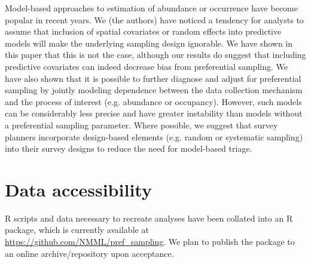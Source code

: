 \documentclass[times,mee,doublespace,]{besauth2}
\begin{document}
Model-based approaches to estimation of abundance or occurrence have become popular in recent years.  We (the authors) have noticed a tendency for analysts to assume that inclusion of spatial covariates or random effects into predictive models will make the underlying sampling design ignorable. We have shown in this paper that this is not the case, although our results do suggest that including predictive covariates can indeed decrease bias from preferential sampling.  We have also shown that it is possible to further diagnose and adjust for preferential sampling by jointly modeling dependence between the data collection mechanism and the process of interest (e.g. abundance or occupancy).  However, such models can be considerably less precise and have greater instability than models without a preferential sampling parameter. Where possible, we suggest that survey planners incorporate design-based elements (e.g. random or systematic sampling) into their survey designs to reduce the need for model-based triage.




\vspace{.3in}
\section{Data accessibility}
R scripts and data necessary to recreate analyses have been collated into an R package, which is currently available at \url{https://github.com/NMML/pref_sampling}.  We plan to publish the package to an online archive/repository upon acceptance. \\




\end{document}
